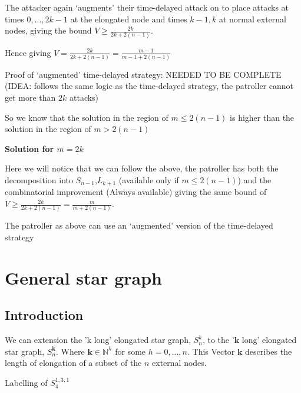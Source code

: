 \documentclass[a4paper,10pt]{article}
\theoremstyle{definition}
\theoremstyle{definition}
\theoremstyle{remark}
\theoremstyle{definition}
\begin{document}
The attacker again `augments' their time-delayed attack on to place attacks at times $0,...,2k-1$ at the elongated node and times $k-1,k$ at normal external nodes, giving the bound $V \geq \frac{2k}{2k+2(n-1)}$.

Hence giving $V=\frac{2k}{2k+2(n-1)}=\frac{m-1}{m-1+2(n-1)}$

Proof of `augmented' time-delayed strategy: NEEDED TO BE COMPLETE (IDEA: follows the same logic as the time-delayed strategy, the patroller cannot get more than $2k$ attacks)

So we know that the solution in the region of $m \leq 2(n-1)$ is higher than the solution in the region of $m > 2(n-1)$

\textbf{Solution for $m=2k$}

Here we will notice that we can follow the above, the patroller has both the decomposition into $S_{n-1}$,$L_{k+1}$ (available only if $m \leq 2(n-1)$) and the combinatorial improvement (Always available) giving the same bound of $V \geq \frac{2k}{2k+2(n-1)}=\frac{m}{m+2(n-1)}$.

The patroller as above can use an `augmented' version of the time-delayed strategy 


\section{General star graph}

\subsection{Introduction}
We can extension the 'k long' elongated star graph, $S_{n}^k$, to the '$\bm{k}$ long' elongated star graph, $S^{\bm{k}}_{n}$. Where $\bm{k} \in \mathbb{N}^{h}$ for some $h=0,...,n$. This Vector $\bm{k}$ describes the length of elongation of a subset of the $n$ external nodes.

\begin{myfigure}
\begin{center}
\end{center}
\caption{Labelling of $S^{1,3,1}_{4}$}
\end{myfigure}
\end{document}
